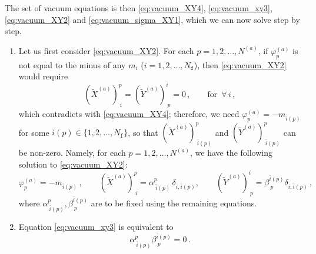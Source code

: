 \documentclass[12pt,a4paper]{article}
\renewcommand{\(}{\left(}
\renewcommand{\)}{\right)}
\renewcommand{\(}{\left(}
\renewcommand{\)}{\right)}
\begin{document}
The set of vacuum equations is then \eqref{eq:vacuum_XY4}, \eqref{eq:vacuum_xy3}, \eqref{eq:vacuum_XY2} and \eqref{eq:vacuum_sigma_XY1}, which we can now solve step by step.


\begin{enumerate}
\item Let us first consider \eqref{eq:vacuum_XY2}. 
For each $p=1,2,\dots,N^{(a)}$, if $\varphi^{(a)}_p$ is not equal to the minus of any $m_i$ ($i=1,2,\dots,N_{\mathtt{f}}$), then \eqref{eq:vacuum_XY2} would require
\begin{equation}
(\tilde{X}^{(a)})^p_{\ i}=(\tilde{Y}^{(a)})^i_{\ p}=0\,,\qquad\textrm{for }\,  \forall \, i\,,
\end{equation}
which contradicts with \eqref{eq:vacuum_XY4}; 
therefore, we need $\varphi^{(a)}_p=-m_{\bar{i}(p)}$ for some 
$\bar{i}(p)\in\{1,2,\dots,N_{\mathtt{f}}\}$, so that $(\tilde{X}^{(a)})^p_{\ \bar{i}(p)}$ and $(\tilde{Y}^{(a)})^p_{\ \bar{i}(p)}$ can be non-zero.  
Namely, for each $p=1,2,\dots,N^{(a)}$, we have the following solution to \eqref{eq:vacuum_XY2}:
\begin{equation}\label{eq:solution1}
\varphi^{(a)}_p=-m_{\bar{i}(p)}\,,\qquad  
(\tilde{X}^{(a)})^p_{\ i}=\alpha^{p}_{\ \bar{i}(p)}\, \delta_{i,\bar{i}(p)}, \qquad 
(\tilde{Y}^{(a)})^i_{\ p}=\beta^{\bar{i}(p)}_{\ p} \delta_{i,\bar{i}(p)}\,,
\end{equation}
where $\alpha^{p}_{\ \bar{i}(p)},\beta^{\bar{i}(p)}_{\ p}$ are to be fixed using the remaining equations. 


\item Equation \eqref{eq:vacuum_xy3} is equivalent to
\begin{equation}\label{eq:alphabeta}
\alpha^{p}_{\ \bar{i}(p)}\beta^{\bar{i}(p)}_{\ p}=0\,.
\end{equation}



\end{enumerate}
\end{document}
